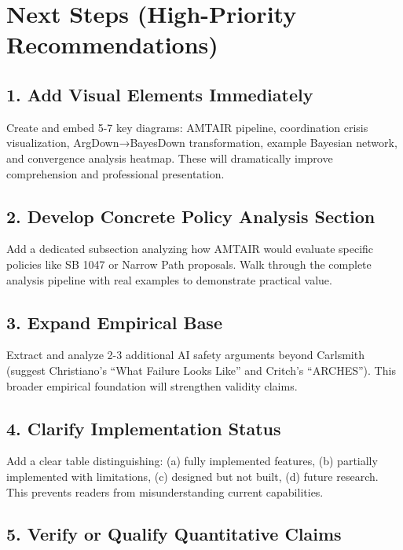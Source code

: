 \documentclass[
  11pt,
  letterpaper,
]{book}
\begin{document}
\section{Next Steps (High-Priority
Recommendations)}\label{next-steps-high-priority-recommendations}

\subsection{1. Add Visual Elements
Immediately}\label{add-visual-elements-immediately}

Create and embed 5-7 key diagrams: AMTAIR pipeline, coordination crisis
visualization, ArgDown→BayesDown transformation, example Bayesian
network, and convergence analysis heatmap. These will dramatically
improve comprehension and professional presentation.

\subsection{2. Develop Concrete Policy Analysis
Section}\label{develop-concrete-policy-analysis-section}

Add a dedicated subsection analyzing how AMTAIR would evaluate specific
policies like SB 1047 or Narrow Path proposals. Walk through the
complete analysis pipeline with real examples to demonstrate practical
value.

\subsection{3. Expand Empirical Base}\label{expand-empirical-base}

Extract and analyze 2-3 additional AI safety arguments beyond Carlsmith
(suggest Christiano's ``What Failure Looks Like'' and Critch's
``ARCHES''). This broader empirical foundation will strengthen validity
claims.

\subsection{4. Clarify Implementation
Status}\label{clarify-implementation-status}

Add a clear table distinguishing: (a) fully implemented features, (b)
partially implemented with limitations, (c) designed but not built, (d)
future research. This prevents readers from misunderstanding current
capabilities.

\subsection{5. Verify or Qualify Quantitative
Claims}\label{verify-or-qualify-quantitative-claims}
\end{document}
